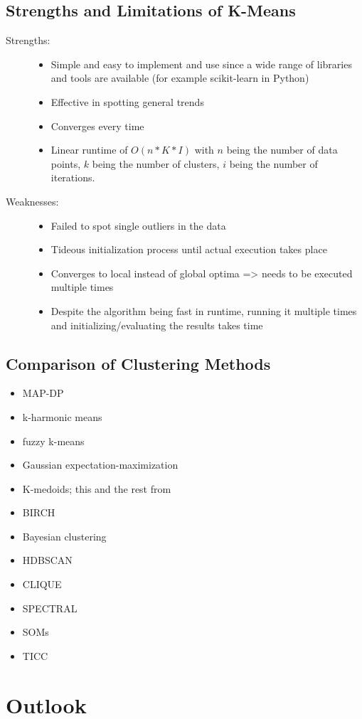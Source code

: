 \subsection{Strengths and Limitations of K-Means}
\begin{description}
    \item[Strengths:]
    \begin{itemize}
        \item Simple and easy to implement and use since a wide range of libraries and tools are available (for example scikit-learn in Python)
        \item Effective in spotting general trends
        \item Converges every time
        \item Linear runtime of $O(n * K * I)$ with $n$ being the number of data points, $k$ being the number of clusters, $i$ being the number of iterations.
    \end{itemize}
    \item[Weaknesses:]
    \begin{itemize}
        \item Failed to spot single outliers in the data
        \item Tideous initialization process until actual execution takes place
        \item Converges to local instead of global optima => needs to be executed multiple times
        \item Despite the algorithm being fast in runtime, running it multiple times and initializing/evaluating the results takes time
    \end{itemize}
\end{description}
\subsection{Comparison of Clustering Methods}
\begin{itemize}
    \item MAP-DP \cite{HAM-ALT}
    \item k-harmonic means \cite{RAY-ALT}
    \item fuzzy k-means \cite{RAY-ALT}
    \item Gaussian expectation-maximization \cite{RAY-ALT}
    \item K-medoids; this and the rest from \cite{COL-ALT}
    \item BIRCH
    \item Bayesian clustering
    \item HDBSCAN
    \item CLIQUE
    \item SPECTRAL
    \item SOMs
    \item TICC
\end{itemize}

\section{Outlook}
